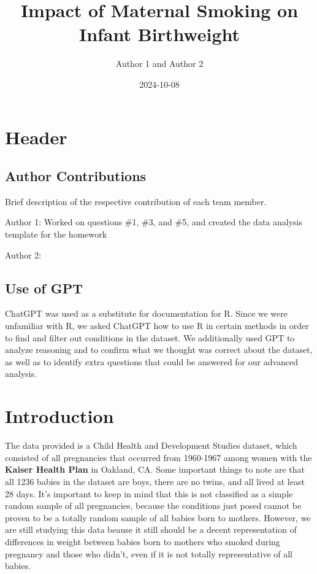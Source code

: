 \documentclass[
]{article}
\title{Impact of Maternal Smoking on Infant Birthweight}
\author{Author 1 and Author 2}
\date{2024-10-08}
\begin{document}
\maketitle

\section{Header}\label{header}

\subsection{Author Contributions}\label{author-contributions}

Brief description of the respective contribution of each team member.

Author 1: Worked on questions \#1, \#3, and \#5, and created the data
analysis template for the homework

Author 2:

\subsection{Use of GPT}\label{use-of-gpt}

ChatGPT was used as a substitute for documentation for R. Since we were
unfamiliar with R, we asked ChatGPT how to use R in certain methods in
order to find and filter out conditions in the dataset. We additionally
used GPT to analyze reasoning and to confirm what we thought was correct
about the dataset, as well as to identify extra questions that could be
answered for our advanced analysis.

\section{Introduction}\label{introduction}

The data provided is a Child Health and Development Studies dataset,
which consisted of all pregnancies that occurred from 1960-1967 among
women with the \textbf{Kaiser Health Plan} in Oakland, CA. Some
important things to note are that all 1236 babies in the dataset are
boys, there are no twins, and all lived at least 28 days. It's important
to keep in mind that this is not classified as a simple random sample of
all pregnancies, because the conditions just posed cannot be proven to
be a totally random sample of all babies born to mothers. However, we
are still studying this data beause it still should be a decent
representation of differences in weight between babies born to mothers
who smoked during pregnancy and those who didn't, even if it is not
totally representative of all babies.
\end{document}
